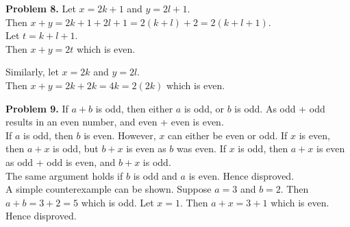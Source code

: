 \documentclass[addpoints]{exam}
\begin{document}
\begin{questions}
\begin{solution}
        \textbf{Problem 8.} Let $ x = 2k + 1 $ and $ y = 2l + 1 $. \\ Then $ x + y = 2k + 1 + 2l + 1 = 2(k+l) + 2 = 2(k + l + 1) $. \\ 
        Let $ t = k + l + 1 $. \\ Then $ x + y = 2t $ which is even.

        Similarly, let $ x = 2k $ and $ y = 2l $. \\ 
        Then $ x + y = 2k + 2k = 4k = 2(2k)$ which is even.

        \textbf{Problem 9.} If $ a + b $ is odd, then either $a$ is odd, or $b$ is odd. As odd + odd results in an even number, and even + even is even. \\ 
        If $a$ is odd, then $b$ is even. However, $x$ can either be even or odd. If $x$ is even, then $a + x$ is odd, but $b + x$ is even as $b$ was even. If $x$ is odd, then $a + x$ is even as odd + odd is even, and $b + x$ is odd. \\ 
        The same argument holds if $b$ is odd and $a$ is even. Hence disproved. \\ 
        A simple counterexample can be shown. Suppose $a = 3$ and $b = 2$. Then $a + b = 3 + 2 = 5$ which is odd. Let $x = 1$. Then $ a + x = 3 + 1 $ which is even. Hence disproved.
    \end{solution}

\end{questions}
\end{document}

